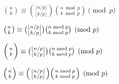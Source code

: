 $ {n \choose k} 
\equiv 
{\lfloor n/p \rfloor \choose \lfloor k/p \rfloor}
{n\bmod p \choose k\bmod p} \pmod p
$

$ \left( {n \atop k} \right)
\equiv 
{\lfloor n/p \rfloor \choose \lfloor k/p \rfloor}
{n\bmod p \choose k\bmod p} \pmod p
$

$ \biggl( {n \atop k} \biggr)
\equiv 
{\lfloor n/p \rfloor \choose \lfloor k/p \rfloor}
{n\bmod p \choose k\bmod p} \pmod p
$


$ \Bigl( {n \atop k} \Bigr)
\equiv 
\Bigl( {\lfloor n/p \rfloor \atop \lfloor k/p \rfloor}\Bigr)
\Bigl( {n\bmod p \atop k\bmod p}\Bigr)
 \pmod p
$



\bye


